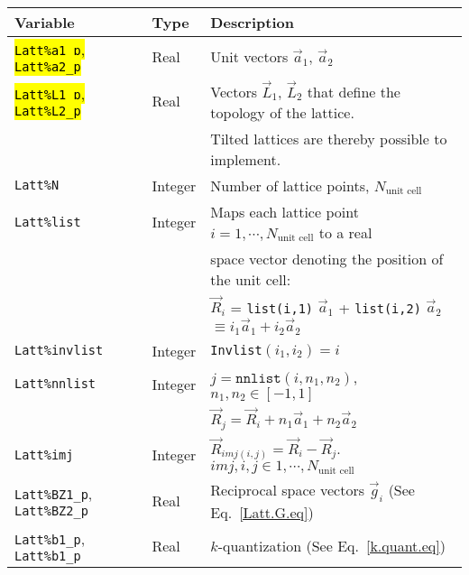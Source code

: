 \documentclass{SciPost}
\DeclareRobustCommand{\hlgray}[1]{{\sethlcolor{dark-gray}\hl{#1}}}
\begin{document}
%
\begin{table}[h]
   \begin{tabular}{@{} l l l @{}}\toprule
    Variable  & Type & Description \\\midrule
     \hlgray{\texttt{Latt\%a1\_p}, \texttt{Latt\%a2\_p}}   & Real     & Unit vectors $\vec{a}_1$,  $\vec{a}_2$ \\ 
     \hlgray{\texttt{Latt\%L1\_p}, \texttt{Latt\%L2\_p}}   & Real     & Vectors $\vec{L}_1$, $\vec{L}_2$ that define the topology of the  lattice. \\
     									  &              &  Tilted lattices are  thereby possible to implement.  \\
    \texttt{Latt\%N}                                                 &   Integer &  Number of lattice points, $N_{\text{unit cell}}$   \\
    \texttt{Latt\%list}                                               & Integer &  Maps each lattice point $i=1,\cdots, N_{\text{unit cell}}$ to a real\\ 
                                                                             &   & space vector denoting the position of the unit cell: \\
                                                                             &   & $\vec{R}_i$ = \texttt{list(i,1)} $\vec{a}_1$ +  \texttt{list(i,2)} $\vec{a}_2$  $  \equiv i_1  \vec{a}_1 + i_2  \vec{a}_2 $ \\
    \texttt{Latt\%invlist}                                        &  Integer &   \texttt{Invlist}$(i_1,i_2) = i $ \\
    \texttt{Latt\%nnlist}                                         &  Integer &   $j = \texttt{nnlist} (i, n_1, n_2) $,  $n_1, n_2 \in [-1,1] $ \\
                                                                           &              &    $\vec{R}_j = \vec{R}_i + n_1 \vec{a}_1  + n_2 \vec{a}_2 $ \\
   \texttt{Latt\%imj}                                             &   Integer  &  $ \vec{R}_{imj(i,j)}  =  \vec{R}_i -  \vec{R}_j$.        $imj, i, j \in  1,\cdots, N_{\text{unit cell}}$\\
    \texttt{Latt\%BZ1\_p}, \texttt{Latt\%BZ2\_p}  &   Real     & Reciprocal space vectors $\vec{g}_i$   (See Eq.~\ref{Latt.G.eq})\\
    \texttt{Latt\%b1\_p}, \texttt{Latt\%b1\_p}       &   Real     &  $k$-quantization (See Eq.~\ref{k.quant.eq}) \\

\end{tabular}
\end{table}
\end{document}
